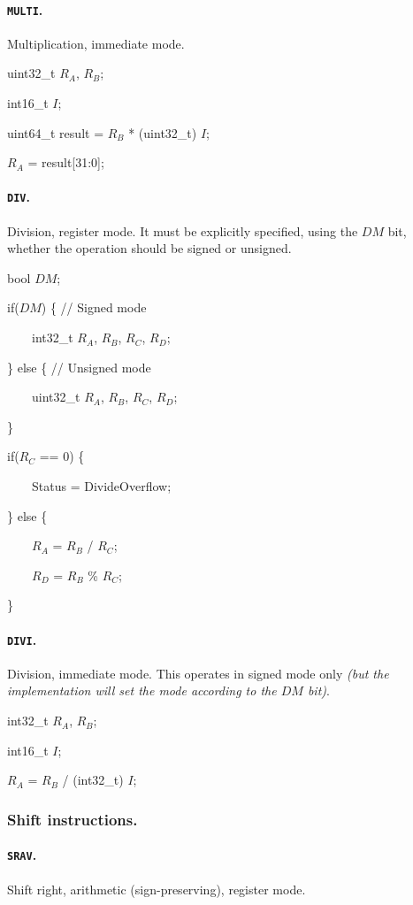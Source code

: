\documentclass[12pt,english,twoside]{report}
\def\code{\texttt}
\def\subsubsubsection{\paragraph}
\newcommand\incomplete[1]{{\color{red}\it #1}}
\newenvironment{codeblock}
{\begin{list}{}{
\setlength{\rightmargin}{\leftmargin}
\setlength{\listparindent}{0pt}%
\raggedright
\setlength{\itemsep}{0pt}
\setlength{\parsep}{0pt}
\normalfont\ttfamily}%
 \item[]}
{\end{list}}
\begin{document}
\subsubsubsection{\label{sec:Ins_MULTI}\code{MULTI}.}
Multiplication, immediate mode.

\begin{codeblock}
  uint32\_t $R_A$, $R_B$;

  int16\_t $I$;

  uint64\_t result = $R_B$ * (uint32\_t) $I$;

  $R_A$ = result[31:0];
\end{codeblock}

\subsubsubsection{\label{sec:Ins_DIV}\code{DIV}.}
Division, register mode. It must be explicitly specified, using
the $DM$ bit, whether the operation should be signed or unsigned.

\begin{codeblock}
  
  bool $DM$;

  if($DM$) \{ // Signed mode

{}~~~~int32\_t $R_A$, $R_B$, $R_C$, $R_D$;
    
  \} else \{ // Unsigned mode
    
{}~~~~uint32\_t $R_A$, $R_B$, $R_C$, $R_D$;
    
  \}

  if($R_C$ == 0) \{

{}~~~~Status = DivideOverflow;

  \} else \{

{}~~~~$R_A$ = $R_B$ / $R_C$;

{}~~~~$R_D$ = $R_B$ \% $R_C$;
    
  \}
\end{codeblock}

\subsubsubsection{\label{sec:Ins_DIVI}\code{DIVI}.}
Division, immediate mode. This operates in signed mode only \incomplete{(but the implementation will set the mode according to the $DM$ bit)}.

\begin{codeblock}
  int32\_t $R_A$, $R_B$;

  int16\_t $I$;

  $R_A$ = $R_B$ / (int32\_t) $I$;
\end{codeblock}

\subsubsection{Shift instructions.}

\subsubsubsection{\label{sec:Ins_SRAV}\code{SRAV}.}
Shift right, arithmetic (sign-preserving), register mode.
\end{document}
